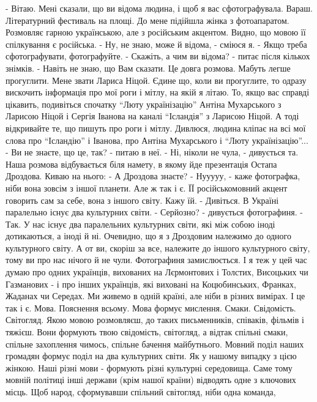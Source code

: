\obeycr
\noindent - Вітаю. Мені сказали, що ви відома людина, і щоб я вас сфотографувала.
Вараш. Літературний фестиваль на площі. До мене підійшла жінка з фотоапаратом. Розмовляє гарною українською, але з російським акцентом. Видно, що мовою її спілкування є російська. 
- Ну, не знаю, може й відома, - сміюся я. - Якщо треба сфотографувати, фотографуйте. 
- Скажіть, а чим ви відома? - питає після кількох знімків. 
- Навіть не знаю, що Вам сказати. Це довга розмова. Мабуть легше прогуглити.
Мене звати Лариса Ніцой. Єдине що, коли ви прогуглите, то одразу вискочить
інформація про мої роги і мітлу, на якій я літаю. То, якщо вас справді
цікавить, подивіться спочатку \enquote{Люту українізацію} Антіна Мухарського з Ларисою
Ніцой і Сергія Іванова на каналі \enquote{Ісландія} з Ларисою Ніцой. А тоді відкривайте
те, що пишуть про роги і мітлу. 
Дивлюся, людина кліпає на всі мої слова про \enquote{Ісландію} і Іванова, про Антіна Мухарського і \enquote{Люту українізацію}... 
- Ви не знаєте, що це, так? - питаю в неї. 
- Ні, ніколи не чула, - дивується та. 
Наша розмова відбувається біля намету, в якому йде презентація Остапа Дроздова. Киваю на нього:
- А Дроздова знаєте?
- Нууууу, - каже фотографка, ніби вона зовсім з іншої планети. Але ж так і є. ЇЇ російськомовний акцент говорить сам за себе, вона з іншого світу.
Кажу їй.
- Дивіться. В Україні паралельно існує два культурних світи. 
- Серйозно? - дивується фотографиня.
- Так. У нас існує два паралельних культурних світи, які між собою іноді
дотикаються, а іноді й ні. Очевидно, що я з Дроздовим належимо до одного
культурного світу. А от ви, скоріш за все, належите до іншого культурного
світу, тому ви про нас нічого й не чули. 
\smallskip
Фотографиня замислюється. І я теж у цей час думаю про одних українців,
вихованих на Лєрмонтових і Толстих, Висоцьких чи Газманових - і про інших
українців, які виховані на Коцюбинських, Франках, Жаданах чи Середах. Ми живемо
в одній країні, але ніби в різних вимірах. І це так і є. 
\smallskip
Мова. Пояснення всьому. Мова формує мислення. Смаки. Свідомість. Світогляд.
Якою мовою розмовляєш, до таких письменників, співаків, фільмів і тяжієш. Вони
формують твою свідомість, світогляд, а відтак спільні смаки, спільне захоплення
чимось, спільне бачення майбутнього. 
\smallskip
Мовний поділ наших громадян формує поділ на два культурних світи. Як у нашому
випадку з цією жінкою. Наші різні мови - формують різні культурні середовища.
\smallskip
Саме тому мовній політиці інші держави (крім нашої країни) відводять одне з
ключових місць. Щоб народ, сформувавши спільний світогляд, ніби одна команда,
